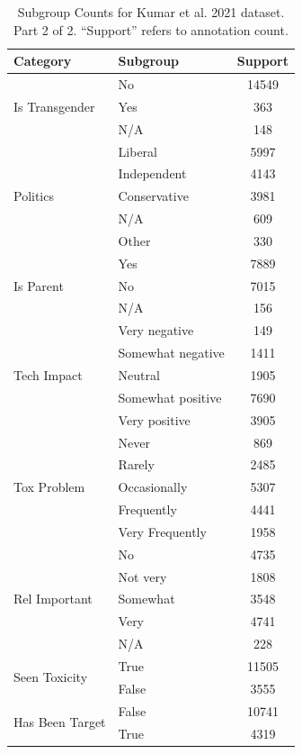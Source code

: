 \documentclass[11pt]{article}
\theoremstyle{definition}
\theoremstyle{plain}
\begin{document}
\begin{table}[t]
	\centering
	\small
	\begin{tabular}{llc}
		\toprule
		\textbf{Category} & \textbf{Subgroup} & \textbf{Support}\\
		\midrule
		\multirow{3}{*}{Is Transgender} & No & 14549 \\
		& Yes & 363 \\
		& N/A & 148 \\
		\midrule
		\multirow{5}{*}{Politics} & Liberal & 5997 \\
		& Independent & 4143 \\
		& Conservative & 3981 \\
		& N/A & 609 \\
		& Other & 330 \\
		\midrule
		\multirow{3}{*}{Is Parent} & Yes & 7889 \\
		& No & 7015 \\
		& N/A & 156 \\
		\midrule
		\multirow{5}{*}{Tech Impact} & Very negative & 149 \\
		& Somewhat negative & 1411 \\
		& Neutral & 1905 \\
		& Somewhat positive & 7690 \\
		& Very positive & 3905 \\
		\midrule
		\multirow{5}{*}{Tox Problem} & Never & 869 \\
		& Rarely & 2485 \\
		& Occasionally & 5307 \\
		& Frequently & 4441 \\
		& Very Frequently & 1958 \\
		\midrule
		\multirow{5}{*}{Rel Important} & No & 4735 \\
		& Not very & 1808 \\
		& Somewhat & 3548 \\
		& Very & 4741 \\
		& N/A & 228 \\
		\midrule
		\multirow{2}{*}{Seen Toxicity} & True & 11505 \\
		& False & 3555 \\
		\midrule
		\multirow{2}{*}{Has Been Target} & False & 10741 \\
		& True & 4319 \\
		\bottomrule
	\end{tabular}
	\caption{Subgroup Counts for Kumar et al. 2021 dataset. Part 2 of 2. ``Support'' refers to annotation count.}
	\label{tab:kumar-stats2}
\end{table}
\end{document}
